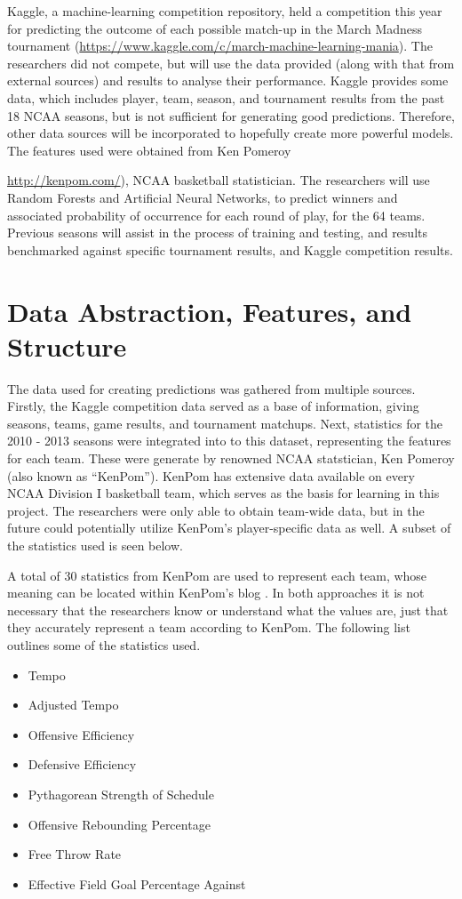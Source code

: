 \documentclass[conference]{IEEEtran}
\begin{document}
Kaggle, a machine-learning competition repository, held a competition this year for predicting the outcome of each possible match-up in the March Madness tournament (\url{https://www.kaggle.com/c/march-machine-learning-mania}).
The researchers did not compete, but will use the data provided (along with that from external sources) and results to analyse their performance.
Kaggle provides some data, which includes player, team, season, and tournament results from the past 18 NCAA seasons, but is not sufficient for generating good predictions.
Therefore, other data sources will be incorporated to hopefully create more powerful models. The features used were obtained from Ken Pomeroy {\url{http://kenpom.com/}), NCAA basketball statistician.
The researchers will use Random Forests and Artificial Neural Networks, to predict winners and associated probability of occurrence for each round of play, for the 64 teams.
Previous seasons will assist in the process of training and testing, and results benchmarked against specific tournament results, and Kaggle competition results.

\section{Data Abstraction, Features, and Structure}
The data used for creating predictions was gathered from multiple sources. 
Firstly, the Kaggle competition data served as a base of information, giving seasons, teams, game results, and tournament matchups.
Next, statistics for the 2010 - 2013 seasons were integrated into to this dataset, representing the features for each team. 
These were generate by renowned NCAA statstician, Ken Pomeroy (also known as ``KenPom'').
KenPom has extensive data available on every NCAA Division I basketball team, which serves as the basis for learning in this project.
The researchers were only able to obtain team-wide data, but in the future could potentially utilize KenPom's player-specific data as well. 
A subset of the statistics used is seen below.

A total of 30 statistics from KenPom are used to represent each team, whose meaning can be located within KenPom's blog \cite{KenPom}. 
In both approaches it is not necessary that the researchers know or understand what the values are, just that they accurately represent a team according to KenPom. The following list outlines some of the statistics used.

\begin{itemize}
  \item Tempo
  \item Adjusted Tempo
  \item Offensive Efficiency
  \item Defensive Efficiency
  \item Pythagorean Strength of Schedule
  \item Offensive Rebounding Percentage
  \item Free Throw Rate
  \item Effective Field Goal Percentage Against
\end{itemize}

}
\end{document}
